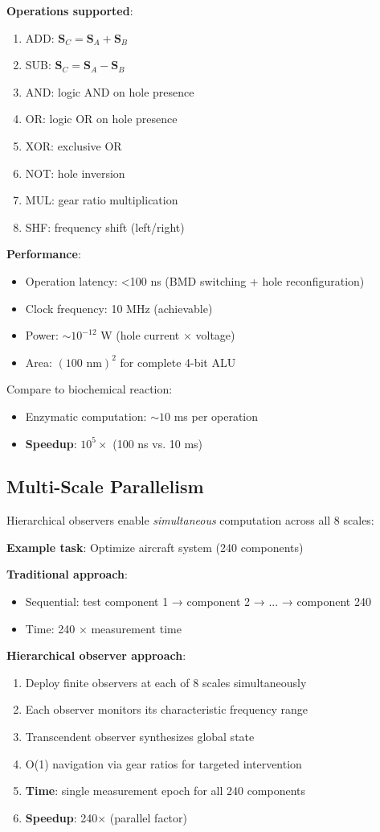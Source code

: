 \documentclass[11pt,a4paper]{article}
\begin{document}
\textbf{Operations supported}:
\begin{enumerate}
\item ADD: $\mathbf{S}_C = \mathbf{S}_A + \mathbf{S}_B$
\item SUB: $\mathbf{S}_C = \mathbf{S}_A - \mathbf{S}_B$
\item AND: logic AND on hole presence
\item OR: logic OR on hole presence
\item XOR: exclusive OR
\item NOT: hole inversion
\item MUL: gear ratio multiplication
\item SHF: frequency shift (left/right)
\end{enumerate}

\textbf{Performance}:
\begin{itemize}
\item Operation latency: <100 ns (BMD switching + hole reconfiguration)
\item Clock frequency: 10 MHz (achievable)
\item Power: $\sim 10^{-12}$ W (hole current × voltage)
\item Area: $(100 \text{ nm})^2$ for complete 4-bit ALU
\end{itemize}

Compare to biochemical reaction:
\begin{itemize}
\item Enzymatic computation: $\sim 10$ ms per operation
\item \textbf{Speedup}: $10^5\times$ (100 ns vs. 10 ms)
\end{itemize}

\subsection{Multi-Scale Parallelism}

Hierarchical observers enable \textit{simultaneous} computation across all 8 scales:

\textbf{Example task}: Optimize aircraft system (240 components)

\textbf{Traditional approach}:
\begin{itemize}
\item Sequential: test component 1 → component 2 → ... → component 240
\item Time: 240 × measurement time
\end{itemize}

\textbf{Hierarchical observer approach}:
\begin{enumerate}
\item Deploy finite observers at each of 8 scales simultaneously
\item Each observer monitors its characteristic frequency range
\item Transcendent observer synthesizes global state
\item O(1) navigation via gear ratios for targeted intervention
\item \textbf{Time}: single measurement epoch for all 240 components
\item \textbf{Speedup}: 240× (parallel factor)
\end{enumerate}
\end{document}
